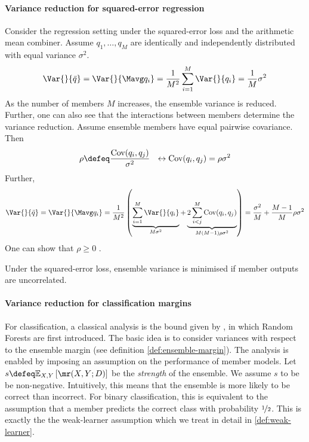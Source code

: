 \documentclass[
	twoside=false, %
]{kaobook}
\begin{document}
\paragraph{Variance reduction for squared-error regression} 
Consider the regression setting under the squared-error loss and the arithmetic mean combiner.
Assume $q_{1}, \dots, q_{M}$ are identically and independently distributed with equal variance $\sigma^2$.
$$
	\Var{}{\bar{q}} = \Var{}{\Mavg q_{i}} = \frac{1}{M^2} \sum_{i=1}^M \Var{}{q_{i}} = \frac{1}{M} \sigma^2
$$
As the number of members $M$ increases, the ensemble variance is reduced. Further, one can also see that the interactions between members determine the variance reduction. Assume ensemble members have equal pairwise covariance. Then 
$$
\rho \defeq \frac{\text{Cov}(q_{i}, q_{j})}{\sigma^2} ~ ~ \leftrightarrow \text{Cov}(q_{i}, q_{j}) = \rho \sigma^2
$$
Further, 
$$
\Var{}{\bar{q}} = \Var{}{\Mavg q_{i}} = \frac{1}{M^2} \left( 
\underbrace{
\sum_{i=1}^M \Var{}{q_{i}}
}_{M\sigma^2}
+
\underbrace{
2 \sum_{i<j}^M \text{Cov}(q_{i}, q_{j})
}_{M(M-1)\rho \sigma^2}
\right)
= \frac{\sigma^2}{M} + \frac{M-1}{M} \rho \sigma^2
$$
One can show that $\rho \geq 0$ \cite{louppe_UnderstandingRandomForests_2015}. 
\begin{corollary}
  \label{cor:members-uncorrelated}
  Under the squared-error loss, ensemble variance is minimised if member outputs are uncorrelated.
\end{corollary}

\paragraph{Variance reduction for classification margins} For classification, a classical analysis is the bound given by \citeauthor{breiman_RandomForests_2001} \cite{breiman_RandomForests_2001}, in which Random Forests are first introduced. The basic idea is to consider variances with respect to the ensemble margin (see definition \ref{def:ensemble-margin}).
The analysis is enabled by imposing an assumption on the performance of member models.
Let $s \defeq \mathbb{E}_{X,Y}\left[ \mr(X, Y; D)  \right]$ be the \textit{strength} of the ensemble.
We assume $s$ to be be non-negative. Intuitively, this means that the ensemble is more likely to be correct than incorrect. For binary classification, this is equivalent to the assumption that a member predicts the correct class with probability $\nicefrac{1}{2}$. This is exactly the the weak-learner assumption which we treat in detail in \cref{def:weak-learner}.
\end{document}
